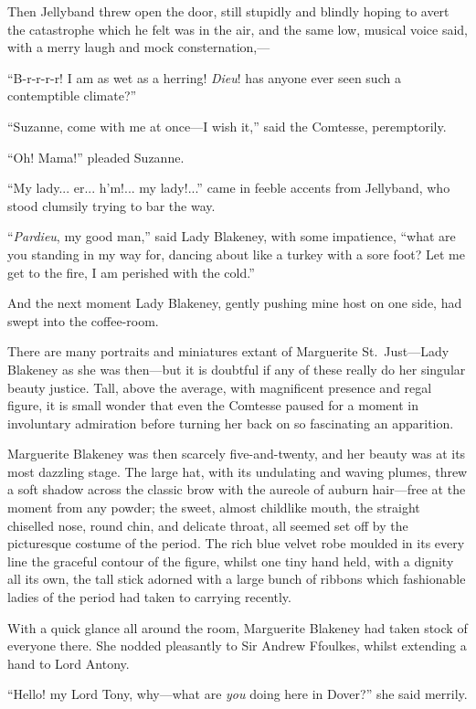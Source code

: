 \documentclass[paper=5.5in:8.5in,BCOR=7mm,twoside,DIV=calc,12pt,usegeometry,chapterprefix,endperiod,headings=big]{scrbook}
\begin{document}
Then Jellyband threw open the door, still stupidly and blindly hoping to avert the catastrophe which he felt was in the air, and the same low, musical voice said, with a merry laugh and mock consternation,---

\enquote{B-r-r-r-r! I am as wet as a herring! \textit{Dieu}! has anyone ever seen such a contemptible climate?}

\enquote{Suzanne, come with me at once---I wish it,} said the Comtesse, peremptorily.

\enquote{Oh! Mama!} pleaded Suzanne.

\enquote{My lady... er... h'm!... my lady!...} came in feeble accents from Jellyband, who stood clumsily trying to bar the way.

\enquote{\textit{Pardieu}, my good man,} said Lady Blakeney, with some impatience, \enquote{what are you standing in my way for, dancing about like a turkey with a sore foot? Let me get to the fire, I am perished with the cold.}

And the next moment Lady Blakeney, gently pushing mine host on one side, had swept into the coffee-room.

There are many portraits and miniatures extant of Marguerite St.~Just---Lady Blakeney as she was then---but it is doubtful if any of these really do her singular beauty justice. Tall, above the average, with magnificent presence and regal figure, it is small wonder that even the Comtesse paused for a moment in involuntary admiration before turning her back on so fascinating an apparition.

Marguerite Blakeney was then scarcely five-and-twenty, and her beauty was at its most dazzling stage. The large hat, with its undulating and waving plumes, threw a soft shadow across the classic brow with the aureole of auburn hair---free at the moment from any powder; the sweet, almost childlike mouth, the straight chiselled nose, round chin, and delicate throat, all seemed set off by the picturesque costume of the period. The rich blue velvet robe moulded in its every line the graceful contour of the figure, whilst one tiny hand held, with a dignity all its own, the tall stick adorned with a large bunch of ribbons which fashionable ladies of the period had taken to carrying recently.

With a quick glance all around the room, Marguerite Blakeney had taken stock of everyone there. She nodded pleasantly to Sir Andrew Ffoulkes, whilst extending a hand to Lord Antony.

\enquote{Hello! my Lord Tony, why---what are \textit{you} doing here in Dover?} she said merrily.
\end{document}
